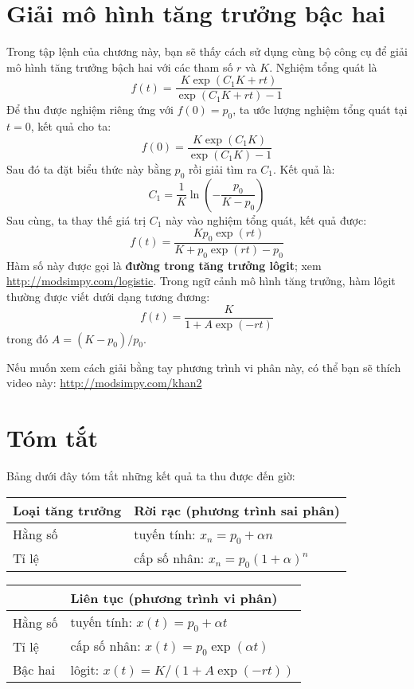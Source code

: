 \documentclass[12pt]{book}
\theoremstyle{exercise}
\begin{document}


\section{Giải mô hình tăng trưởng bậc hai}

Trong tập lệnh của chương này, bạn sẽ thấy cách sử dụng cùng bộ công cụ để giải mô hình tăng trưởng bậch hai với các tham số $r$ và $K$.  Nghiệm tổng quát là 
%
\[ f{\left (t \right )} = \frac{K \exp(C_{1} K + r t)}{\exp(C_{1} K + r t) - 1} \]
%
Để thu được nghiệm riêng ứng với $f(0) = p_0$, ta ước lượng nghiệm tổng quát tại $t=0$, kết quả cho ta:
%
\[ f(0) = \frac{K \exp(C_{1} K)}{\exp(C_{1} K) - 1} \]
%
Sau đó ta đặt biểu thức này bằng $p_0$ rồi giải tìm ra $C_1$.  Kết quả là:
%
\[ C_1 = \frac{1}{K} \ln{\left (- \frac{p_{0}}{K - p_{0}} \right )} \]
%
Sau cùng, ta thay thế giá trị $C_1$ này vào nghiệm tổng quát, kết quả được:
%
\[ f(t) = \frac{K p_{0} \exp(r t)}{K + p_{0} \exp(r t) - p_{0}} \]
%
Hàm số này được gọi là {\bf đường trong tăng trưởng lôgit}; xem \url{http://modsimpy.com/logistic}.  Trong ngữ cảnh mô hình tăng trưởng, hàm lôgit thường được viết dưới dạng tương đương:
%
\[ f(t) = \frac{K}{1 + A \exp(-rt)} \]
%
trong đó $A = (K - p_0) / p_0$.

Nếu muốn xem cách giải bằng tay phương trình vi phân này, có thể bạn sẽ 
thích video này: \url{http://modsimpy.com/khan2}


\section{Tóm tắt}

Bảng dưới đây tóm tắt những kết quả ta thu được đến giờ:

\begin{tabular}{l|l} 
\hline
Loại tăng trưởng         & Rời rạc (phương trình sai phân) \\ 
\hline 
Hằng số & tuyến tính: $x_n = p_0 + \alpha n$  \\ 
 
Tỉ lệ & cấp số nhân: $x_n = p_0(1+\alpha)^n$  \\ 

\end{tabular} 

\begin{tabular}{l|l} 
\hline
        & Liên tục (phương trình vi phân) \\ 
\hline 
Hằng số & tuyến tính: $x(t) = p_0 + \alpha t$ \\ 
 
Tỉ lệ & cấp số nhân: $x(t) = p_0 \exp(\alpha t)$ \\ 
 
Bậc hai & lôgit: $x(t) = K / (1 + A\exp(-rt))$ \\ 
\end{tabular} 
\end{document}
